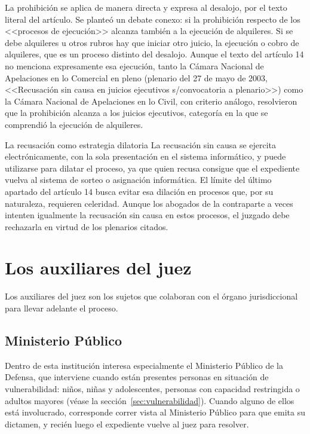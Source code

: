 \documentclass[12pt,oneside]{book}
\begin{document}
La prohibición se aplica de manera directa y expresa al desalojo, por el texto literal del artículo. Se planteó un debate conexo: si la prohibición respecto de los <<procesos de ejecución>> alcanza también a la ejecución de alquileres. Si se debe alquileres u otros rubros hay que iniciar otro juicio, la ejecución o cobro de alquileres, que es un proceso distinto del desalojo. Aunque el texto del artículo 14 no menciona expresamente esa ejecución, tanto la Cámara Nacional de Apelaciones en lo Comercial en pleno (plenario del 27 de mayo de 2003, <<Recusación sin causa en juicios ejecutivos s/convocatoria a plenario>>) como la Cámara Nacional de Apelaciones en lo Civil, con criterio análogo, resolvieron que la prohibición alcanza a los juicios ejecutivos, categoría en la que se comprendió la ejecución de alquileres.

\begin{example}{La recusación como estrategia dilatoria}
La recusación sin causa se ejercita electrónicamente, con la sola presentación en el sistema informático, y puede utilizarse para dilatar el proceso, ya que quien recusa consigue que el expediente vuelva al sistema de sorteo o asignación informática. El límite del último apartado del artículo 14 busca evitar esa dilación en procesos que, por su naturaleza, requieren celeridad. Aunque los abogados de la contraparte a veces intenten igualmente la recusación sin causa en estos procesos, el juzgado debe rechazarla en virtud de los plenarios citados.
\end{example}

\section{Los auxiliares del juez}

Los auxiliares del juez son los sujetos que colaboran con el órgano jurisdiccional para llevar adelante el proceso.

\subsection{Ministerio Público}

Dentro de esta institución interesa especialmente el Ministerio Público de la Defensa, que interviene cuando están presentes personas en situación de vulnerabilidad: niños, niñas y adolescentes, personas con capacidad restringida o adultos mayores (véase la sección~\ref{sec:vulnerabilidad}). Cuando alguno de ellos está involucrado, corresponde correr vista al Ministerio Público para que emita su dictamen, y recién luego el expediente vuelve al juez para resolver.
\end{document}
